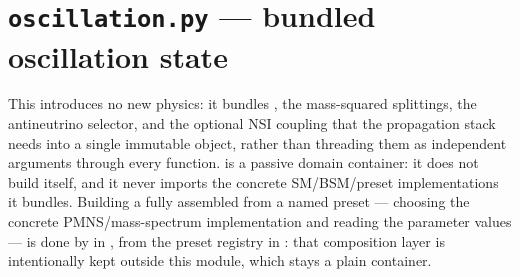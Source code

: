\section{\texttt{oscillation.py} --- bundled oscillation state}


\begin{implbox}
This introduces no new physics: it bundles , the mass-squared
splittings, the antineutrino selector, and the optional NSI coupling that
the propagation stack needs into a single immutable object, rather than
threading them as independent arguments through every function.
 is a passive domain container: it does not
build itself, and it never imports the
concrete SM/BSM/preset implementations it bundles. Building a fully
assembled  from a named preset --- choosing
the concrete PMNS/mass-spectrum implementation and reading the parameter
values --- is done by
 in
, from the preset registry in
: that composition layer is intentionally
kept outside this module, which stays a plain container.
\end{implbox}

